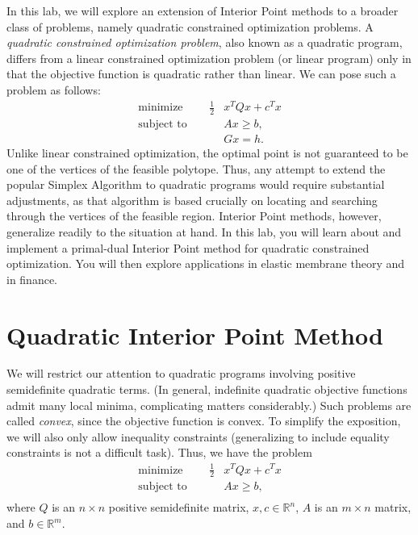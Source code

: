 
In this lab, we will explore an extension of Interior Point methods to a broader class of
problems, namely quadratic constrained optimization problems.
A \emph{quadratic constrained optimization problem}, also known as a quadratic program,
differs from a linear constrained optimization problem (or linear program) only in that
the objective function is quadratic rather than linear.
We can pose such a problem as follows:
\begin{align*}
\text{minimize }\qquad \frac{1}{2}&x^TQx + c^Tx\\
\text{subject to }\qquad &Ax \geq b,\\
&Gx = h.
\end{align*}
Unlike linear constrained optimization, the optimal point is not guaranteed to be one of the vertices of the
feasible polytope. Thus, any attempt to extend the popular Simplex Algorithm to quadratic
programs would require substantial adjustments, as that algorithm is based crucially on locating and searching through
the vertices of the feasible region. Interior Point methods, however, generalize readily to the situation at hand.
In this lab, you will learn about and implement a primal-dual Interior Point method for quadratic constrained
optimization. You will then explore applications in elastic membrane theory and in finance.

\section*{Quadratic Interior Point Method}
We will restrict our attention to quadratic programs involving positive semidefinite quadratic terms.
(In general, indefinite quadratic objective functions admit many local minima, complicating matters
considerably.) Such problems are called \emph{convex}, since the objective function is convex.
To simplify the exposition, we will also only allow inequality constraints (generalizing to
include equality constraints is not a difficult task). Thus, we have the problem
\begin{align*}
\text{minimize }\qquad \frac{1}{2}&x^TQx + c^Tx\\
\text{subject to }\qquad &Ax \geq b,\\
\end{align*}
where $Q$ is an $n\times n$ positive semidefinite matrix, $x, c \in \mathbb{R}^n$, $A$ is an $m \times n$ matrix,
and $b \in \mathbb{R}^m$.

